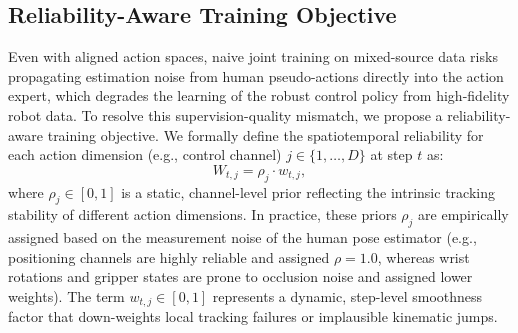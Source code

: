 \documentclass{article}
\begin{document}


\subsection{Reliability-Aware Training Objective}
\label{sec:reliability-aware-objective}

Even with aligned action spaces, naive joint training on mixed-source data risks propagating estimation noise from human pseudo-actions directly into the action expert, which degrades the learning of the robust control policy from high-fidelity robot data. To resolve this supervision-quality mismatch, we propose a reliability-aware training objective. 
We formally define the spatiotemporal reliability for each action dimension (e.g., control channel) \(j \in \{1, \dots, D\}\) at step \(t\) as:
\begin{equation}
W_{t,j} = \rho_j \cdot w_{t,j},
\label{eq:reliability}
\end{equation}
where \(\rho_j \in [0, 1]\) is a static, channel-level prior reflecting the intrinsic tracking stability of different action dimensions. In practice, these priors \(\rho_j\) are empirically assigned based on the measurement noise of the human pose estimator (e.g., positioning channels are highly reliable and assigned \(\rho=1.0\), whereas wrist rotations and gripper states are prone to occlusion noise and assigned lower weights). The term \(w_{t,j} \in [0, 1]\) represents a dynamic, step-level smoothness factor that down-weights local tracking failures or implausible kinematic jumps. 
\end{document}
